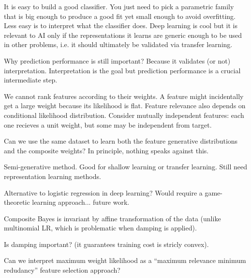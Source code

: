 \documentclass[english]{scrartcl}
\def\y{{\mathbf{y}}}
\newcommand{\blambda}{{\boldsymbol{\lambda}}}
\begin{document}
It is easy to build a good classifier. You just need to pick a parametric family that is big enough to produce a good fit yet small enough to avoid overfitting. Less easy is to interpret what the classifier does. Deep learning is cool but it is relevant to AI only if the representations it learns are generic enough to be used in other problems, i.e. it should ultimately be validated via transfer learning.

{\color{red} Why prediction performance is still important? Because it validates (or not) interpretation. Interpretation is the goal but prediction performance is a crucial intermediate step.}

{\color{red} We cannot rank features according to their weights. A feature might incidentally get a large weight because its likelihood is flat. Feature relevance also depends on conditional likelihood distribution. Consider mutually independent features: each one recieves a unit weight, but some may be independent from target.}

{\color{red} Can we use the same dataset to learn both the feature generative distributions and the composite weights? In principle, nothing speaks against this.} 

{\color{red} Semi-generative method. Good for shallow learning or transfer learning. Still need representation learning methods.}

{\color{red} Alternative to logistic regression in deep learning? Would require a game-theoretic learning approach... future work.} 

{\color{red} Composite Bayes is invariant by affine transformation of the data (unlike multinomial LR, which is problematic when damping is applied).}

{\color{red} Is damping important? (it guarantees training cost is stricly convex).}

{\color{red} Can we interpret maximum weight likelihood as a ``maximum relevance minimum redudancy'' feature selection approach?}

\end{document}
